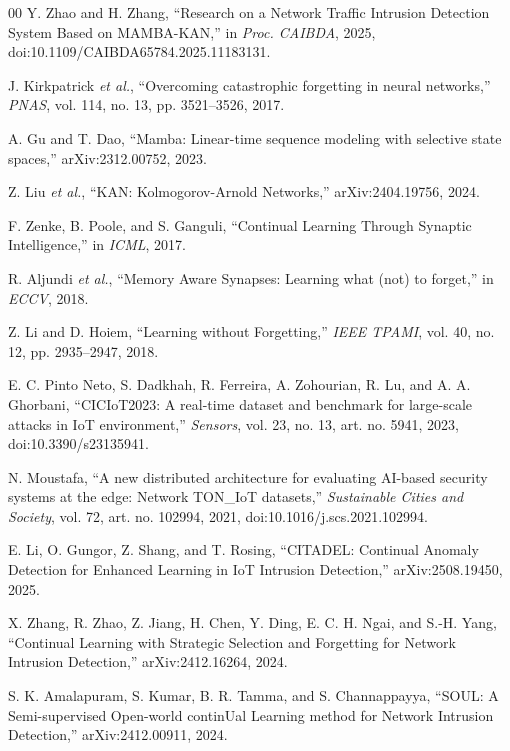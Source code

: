 \documentclass[a4paper,fleqn]{cas-dc}
\begin{document}
\begin{thebibliography}{00}
Y. Zhao and H. Zhang, ``Research on a Network Traffic Intrusion Detection System Based on MAMBA-KAN,'' in \textit{Proc. CAIBDA}, 2025, doi:10.1109/CAIBDA65784.2025.11183131.

J. Kirkpatrick \textit{et al.}, ``Overcoming catastrophic forgetting in neural networks,'' \textit{PNAS}, vol. 114, no. 13, pp. 3521--3526, 2017.

A. Gu and T. Dao, ``Mamba: Linear-time sequence modeling with selective state spaces,'' arXiv:2312.00752, 2023.

Z. Liu \textit{et al.}, ``KAN: Kolmogorov-Arnold Networks,'' arXiv:2404.19756, 2024.

F. Zenke, B. Poole, and S. Ganguli, ``Continual Learning Through Synaptic Intelligence,'' in \textit{ICML}, 2017.

R. Aljundi \textit{et al.}, ``Memory Aware Synapses: Learning what (not) to forget,'' in \textit{ECCV}, 2018.

Z. Li and D. Hoiem, ``Learning without Forgetting,'' \textit{IEEE TPAMI}, vol. 40, no. 12, pp. 2935--2947, 2018.

E. C. Pinto Neto, S. Dadkhah, R. Ferreira, A. Zohourian, R. Lu, and A. A. Ghorbani, ``CICIoT2023: A real-time dataset and benchmark for large-scale attacks in IoT environment,'' \textit{Sensors}, vol. 23, no. 13, art. no. 5941, 2023, doi:10.3390/s23135941.

N. Moustafa, ``A new distributed architecture for evaluating AI-based security systems at the edge: Network TON\_IoT datasets,'' \textit{Sustainable Cities and Society}, vol. 72, art. no. 102994, 2021, doi:10.1016/j.scs.2021.102994.

E. Li, O. Gungor, Z. Shang, and T. Rosing, ``CITADEL: Continual Anomaly Detection for Enhanced Learning in IoT Intrusion Detection,'' arXiv:2508.19450, 2025.

X. Zhang, R. Zhao, Z. Jiang, H. Chen, Y. Ding, E. C. H. Ngai, and S.-H. Yang, ``Continual Learning with Strategic Selection and Forgetting for Network Intrusion Detection,'' arXiv:2412.16264, 2024.

S. K. Amalapuram, S. Kumar, B. R. Tamma, and S. Channappayya, ``SOUL: A Semi-supervised Open-world continUal Learning method for Network Intrusion Detection,'' arXiv:2412.00911, 2024.


\end{thebibliography}
\end{document}
